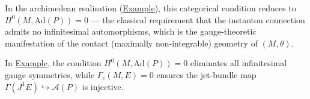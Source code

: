 \begin{remark}
In the archimedean realisation
(\hyperref[def:c-quantum-observable-universe]{Example}), this categorical
condition reduces to
$H^0(M, \mathrm{Ad}(P)) = 0$ --- the classical requirement that the
instanton connection admits no infinitesimal automorphisms, which is the
gauge-theoretic manifestation of the contact (maximally non-integrable)
geometry of $(M, \theta)$.
\end{remark}

\begin{remark}
  \label{rem:vanishing-explication}
In \hyperref[def:c-quantum-observable-universe]{Example}, the condition
$H^0(M, \mathrm{Ad}(P)) = 0$ eliminates all infinitesimal gauge
symmetries, while $\Gamma_c(M,E) = 0$ ensures the jet-bundle
map $\Gamma(J^1 E) \hookrightarrow \mathcal{A}(P)$ is injective.
\end{remark}


